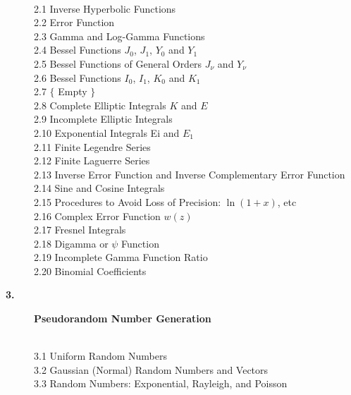 \documentclass[twoside]{MATH77}
\begin{document}
\begin{description}
\vspace{-20pt}
\begin{tabbing}
\hspace{.45in}\=\\
\phantom{1}2.1 \> Inverse Hyperbolic Functions\\
\phantom{1}2.2 \> Error Function\\
\phantom{1}2.3 \> Gamma and Log-Gamma Functions\\
\phantom{1}2.4 \> Bessel Functions $J_0$, $J_1$, $Y_0$ and $Y_1$\\
\phantom{1}2.5 \> Bessel Functions of General Orders $J_\nu $ and $Y_\nu $\\
\phantom{1}2.6 \> Bessel Functions $I_0$, $I_1$, $K_0$ and $K_1$\\
\phantom{1}2.7 \> $\{$ Empty $\}$\\
\phantom{1}2.8 \> Complete Elliptic Integrals $K$ and $E$\\
\phantom{1}2.9 \> Incomplete Elliptic Integrals\\
\phantom{1}2.10 \> Exponential Integrals Ei and $E_1$\\
\phantom{1}2.11 \> Finite Legendre Series\\
\phantom{1}2.12 \> Finite Laguerre Series\\
\phantom{1}2.13 \> Inverse Error Function and Inverse Complementary Error Function\\
\phantom{1}2.14 \> Sine and Cosine Integrals\\
\phantom{1}2.15 \> Procedures to Avoid Loss of Precision: $\ln (1+x)$, etc\\
\phantom{1}2.16 \> Complex Error Function $w(z)$\\
\phantom{1}2.17 \> Fresnel Integrals\\
\phantom{1}2.18 \> Digamma or $\psi $ Function\\
\phantom{1}2.19 \> Incomplete Gamma Function Ratio\\
\phantom{1}2.20 \> Binomial Coefficients\\
\end{tabbing}\vspace{-15pt}

\item[\large \bf 3.]  {\large {\bf Pseudorandom Number Generation}}

\vspace{-20pt}
\begin{tabbing}
\hspace{.45in}\=\\
\phantom{1}3.1 \> Uniform Random Numbers\\
\phantom{1}3.2 \> Gaussian (Normal) Random Numbers and Vectors\\
\phantom{1}3.3 \> Random Numbers: Exponential, Rayleigh, and Poisson\\
\end{tabbing}\vspace{-15pt}


\end{description}
\end{document}
